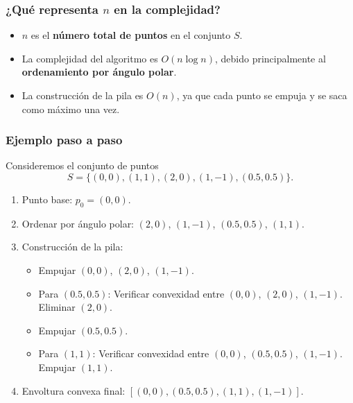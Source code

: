 \documentclass[12pt]{book}
\theoremstyle{definition}
\theoremstyle{plain}
\theoremstyle{remark}
\begin{document}
\subsubsection{¿Qué representa \( n \) en la complejidad?}
\begin{itemize}
    \item \( n \) es el \textbf{número total de puntos} en el conjunto \( S \).
    \item La complejidad del algoritmo es \( O(n \log n) \), debido principalmente al \textbf{ordenamiento por ángulo polar}.
    \item La construcción de la pila es \( O(n) \), ya que cada punto se empuja y se saca como máximo una vez.
\end{itemize}

\subsubsection{Ejemplo paso a paso}
Consideremos el conjunto de puntos \[ S = \{(0,0), (1,1), (2,0), (1,-1), (0.5,0.5)\}. \]
\begin{enumerate}
    \item Punto base: \( p_0 = (0,0) \).
    \item Ordenar por ángulo polar: \( (2,0) \), \( (1,-1) \), \( (0.5,0.5) \), \( (1,1) \).
    \item Construcción de la pila:
    \begin{itemize}
        \item Empujar \( (0,0) \), \( (2,0) \), \( (1,-1) \).
        \item Para \( (0.5,0.5) \): 
        Verificar convexidad entre \( (0,0) \), \( (2,0) \), \( (1,-1) \). 
        Eliminar \( (2,0) \).
        \item Empujar \( (0.5,0.5) \).
        \item Para \( (1,1) \): 
        Verificar convexidad entre \( (0,0) \), \( (0.5,0.5) \), \( (1,-1) \). 
        Empujar \( (1,1) \).
    \end{itemize}
    \item Envoltura convexa final: \( [(0,0), (0.5,0.5), (1,1), (1,-1)] \).
\end{enumerate}

%
%
%
%
%
\end{document}
